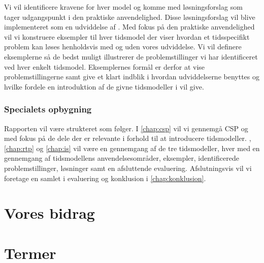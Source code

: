 Vi vil identificere kravene for hver model og komme med løsningsforslag som tager udgangspunkt i den praktiske anvendelighed. Disse løsningsforslag vil blive implementeret som en udviddelse af \pycsp. Med fokus på den praktiske anvendelighed vil vi konstruere eksempler til hver tidsmodel der viser hvordan et tidsspecifikt problem kan løses henholdsvis med og uden vores udviddelse. Vi vil definere eksemplerne så de bedst muligt illustrerer de problemstillinger vi har identificeret ved hver enkelt tidsmodel. Eksemplernes formål er derfor at vise problemstillingerne samt give et klart indblik i hvordan udviddelserne benyttes og hvilke fordele en introduktion af de givne tidsmodeller i \pycsp vil give. 

\subsubsection{Specialets opbygning}
Rapporten vil være strukteret som følger. I \autoref{chap:csp} vil vi gennemgå CSP og \pycsp med fokus på de dele der er relevante i forhold til at introducere tidsmodeller. 
, \ref{chap:rtp} og \ref{chap:is} vil være en gennemgang af de tre tidsmodeller, hver med en gennemgang af tidsmodellens anvendelsesområder, eksempler, identificerede problemstillinger, løsninger samt en afsluttende evaluering. Afslutningsvis vil vi foretage en samlet i evaluering og konklusion i \autoref{chap:konklusion}.




\section{Vores bidrag}
\section{Termer}

